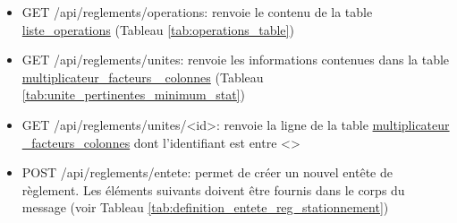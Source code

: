 \begin{itemize}
\begin{itemize}
\begin{itemize}
        \end{itemize}
        \item définition: une table contenant la définition du règlement avec les éléments suivants
        \begin{itemize}
            \item id\_reg\_stat\_emp: identifiant unique de la ligne de définition mathématique
            \item id\_reg\_stat: identifiant du règlement
            \item ss\_ensemble: sous-ensemble du règlement auquel appartient la ligne
            \item seuil: seuil au dessus duquel le règlement s'applique quand l'opérateur à l'intérieur du sous-ensemble
            \item oper: colonne contenant les opérateurs. Le premier élément du sous-ensemble contient l'opérateur applicable entre ce sous-ensemble et le précédent, les autres sont l'opérateur utilisé entre les lignes 
            \item cases\_fix\_min: ordonnée à l'origine de la droite représentant le stationnement minimum
            \item pente\_min: pente de la droite représentant le stationnement minimum
            \item cases\_fix\_max: ordonnée à l'origine de la droite représentant le stationnement maximum
            \item pente\_max: pente de la droite représentant le stationnement maximum
            \item unite: unité de l'axe des x de la droite pour les requis minimum et maximum
        \end{itemize}
    \end{itemize}
    \item GET /api/reglements/operations: renvoie le contenu de la table \ul{liste\_operations} (Tableau \ref{tab:operations_table})
    \item GET /api/reglements/unites: renvoie les informations contenues dans la table \ul{multiplicateur\_facteurs\_ colonnes} (Tableau \ref{tab:unite_pertinentes_minimum_stat})
    \item GET /api/reglements/unites/<id>: renvoie la ligne de la table \ul{multiplicateur \_facteurs\_colonnes} dont l'identifiant est entre <>
    \item POST /api/reglements/entete: permet de créer un nouvel entête de règlement. Les éléments suivants doivent être fournis dans le corps du message (voir Tableau \ref{tab:definition_entete_reg_stationnement})

\end{itemize}
